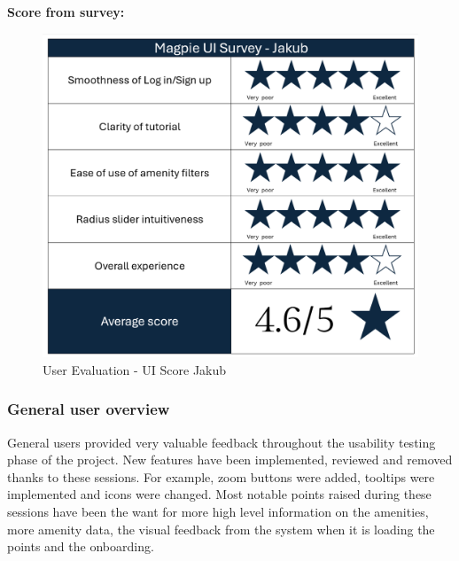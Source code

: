 \textbf{Score from survey: }
\begin{figure}[h!]
    \centering
    \includegraphics[width=\textwidth]{images/survey-jakub.png}
    \caption{User Evaluation - UI Score Jakub}
\end{figure}

\subsubsection{General user overview}
General users provided very valuable feedback throughout the usability testing
phase of the project. New features have been implemented, reviewed and removed
thanks to these sessions.
For example, zoom buttons were added, tooltips were implemented and icons were
changed. Most notable points raised during these sessions have been the want for
more high level information on the amenities, more amenity data, the visual
feedback from the system when it is loading the points and the onboarding.

